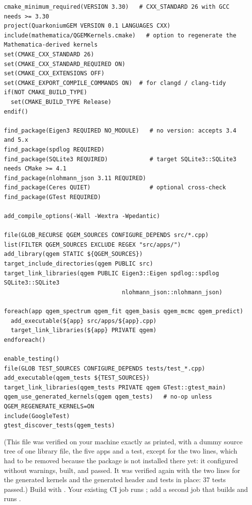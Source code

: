 \documentclass[11pt,a4paper]{article}
\numberwithin{equation}{section}
\theoremstyle{definition}
\theoremstyle{plain}
\theoremstyle{remark}
\numberwithin{algorithm}{section}
\begin{document}
\begin{lstlisting}[style=cmake]
cmake_minimum_required(VERSION 3.30)   # CXX_STANDARD 26 with GCC needs >= 3.30
project(QuarkoniumGEM VERSION 0.1 LANGUAGES CXX)
include(mathematica/QGEMKernels.cmake)   # option to regenerate the Mathematica-derived kernels
set(CMAKE_CXX_STANDARD 26)
set(CMAKE_CXX_STANDARD_REQUIRED ON)
set(CMAKE_CXX_EXTENSIONS OFF)
set(CMAKE_EXPORT_COMPILE_COMMANDS ON)  # for clangd / clang-tidy
if(NOT CMAKE_BUILD_TYPE)
  set(CMAKE_BUILD_TYPE Release)
endif()

find_package(Eigen3 REQUIRED NO_MODULE)   # no version: accepts 3.4 and 5.x
find_package(spdlog REQUIRED)
find_package(SQLite3 REQUIRED)            # target SQLite3::SQLite3 needs CMake >= 4.1
find_package(nlohmann_json 3.11 REQUIRED)
find_package(Ceres QUIET)                 # optional cross-check
find_package(GTest REQUIRED)

add_compile_options(-Wall -Wextra -Wpedantic)

file(GLOB_RECURSE QGEM_SOURCES CONFIGURE_DEPENDS src/*.cpp)
list(FILTER QGEM_SOURCES EXCLUDE REGEX "src/apps/")
add_library(qgem STATIC ${QGEM_SOURCES})
target_include_directories(qgem PUBLIC src)
target_link_libraries(qgem PUBLIC Eigen3::Eigen spdlog::spdlog SQLite3::SQLite3
                                  nlohmann_json::nlohmann_json)

foreach(app qgem_spectrum qgem_fit qgem_basis qgem_mcmc qgem_predict)
  add_executable(${app} src/apps/${app}.cpp)
  target_link_libraries(${app} PRIVATE qgem)
endforeach()

enable_testing()
file(GLOB TEST_SOURCES CONFIGURE_DEPENDS tests/test_*.cpp)
add_executable(qgem_tests ${TEST_SOURCES})
target_link_libraries(qgem_tests PRIVATE qgem GTest::gtest_main)
qgem_use_generated_kernels(qgem qgem_tests)   # no-op unless QGEM_REGENERATE_KERNELS=ON
include(GoogleTest)
gtest_discover_tests(qgem_tests)
\end{lstlisting}
(This file was verified on your machine exactly as printed, with a dummy source tree of one library file, the five apps and a test, except for the two  lines, which had to be removed because the package is not installed there yet: it configured without warnings, built, and  passed. It was verified again with the two lines for the generated kernels and the generated header and tests in place: 37 tests passed.) Build with . Your existing CI job runs ; add a second job that builds and runs .
\end{document}

